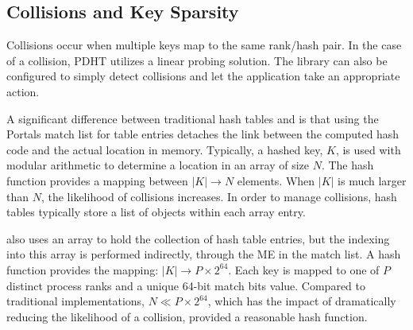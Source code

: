 \subsection{Collisions and Key Sparsity}

Collisions occur when multiple keys map to the same rank/hash pair.
In the case of a collision,
PDHT utilizes a linear probing solution. The library can
also be configured to simply detect collisions and let the application
take an appropriate action.

A significant difference between traditional hash tables and \pdht is
that using the Portals match list for table entries detaches the link
between the computed hash code and the actual location in
memory. Typically, a hashed key, $K$,  is used with modular arithmetic to
determine a location in an array of size $N$. The hash function
provides a mapping between $|K| \rightarrow N$ elements. When $|K|$ is
much larger than $N$, the likelihood of collisions increases. In order
to manage collisions, hash tables typically store a list of objects within
each array entry.
% 
%
%

\pdht also uses an array to hold the collection of hash table
entries, but the indexing into this array is performed indirectly,
through the ME in the match list. A \pdht hash function provides the 
mapping: $|K| \rightarrow P \times 2^{64}$. Each key is mapped to one
of $P$ distinct process ranks and a unique 64-bit match bits
value. Compared to traditional implementations, $N \ll  P \times
2^{64}$, which has the impact of dramatically reducing the likelihood
of a collision, provided a reasonable hash function.


